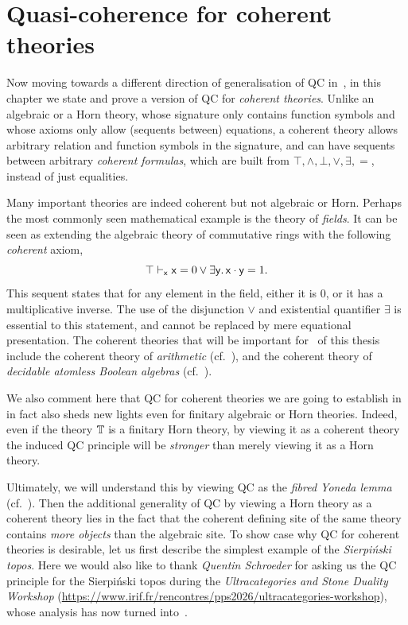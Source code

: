\chapter{Quasi-coherence for coherent theories}\label{ch:sqccoh}

Now moving towards a different direction of generalisation of \gls{QC} in~, in this chapter we state and prove a version of \gls{QC} for \emph{coherent theories}. Unlike an algebraic or a Horn theory, whose signature only contains function symbols and whose axioms only allow (sequents between) equations, a coherent theory allows arbitrary relation and function symbols in the signature, and can have sequents between arbitrary \emph{coherent formulas}, which are built from $\top,\wedge,\bot,\vee,\exists,=$, instead of just equalities.

Many important theories are indeed coherent but not algebraic or Horn. Perhaps the most commonly seen mathematical example is the theory of \emph{fields}. It can be seen as extending the algebraic theory of commutative rings with the following \emph{coherent} axiom,
\[ \top \vdash_{\mathsf{x}} \mathsf{x} = 0 \vee \exists \mathsf{y}.\, \mathsf{x}\cdot \mathsf{y} = 1. \]
This sequent states that for any element in the field, either it is 0, or it has a multiplicative inverse. The use of the disjunction $\vee$ and existential quantifier $\exists$ is essential to this statement, and cannot be replaced by mere equational presentation. The coherent theories that will be important for~ of this thesis include the coherent theory of \emph{arithmetic} (cf.~\citet{ye_categorical_2026}), and the coherent theory of \emph{decidable atomless Boolean algebras} (cf.~\citet[D3.4.12]{johnstone2002sketches}).

We also comment here that \gls{QC} for coherent theories we are going to establish in~ in fact also sheds new lights even for finitary algebraic or Horn theories. Indeed, even if the theory $\mathbb{T}$ is a finitary Horn theory, by viewing it as a coherent theory the induced \gls{QC} principle will be \emph{stronger} than merely viewing it as a Horn theory. 

Ultimately, we will understand this by viewing \gls{QC} as the \emph{fibred Yoneda lemma} (cf.~). Then the additional generality of \gls{QC} by viewing a Horn theory as a coherent theory lies in the fact that the coherent defining site of the same theory contains \emph{more objects} than the algebraic site. To show case why \gls{QC} for coherent theories is desirable, let us first describe the simplest example of the \emph{Sierpi\'nski topos}. Here we would also like to thank \emph{Quentin Schroeder} for asking us the \gls{QC} principle for the Sierpi\'nski topos during the \emph{Ultracategories and Stone Duality Workshop} (\url{https://www.irif.fr/rencontres/pps2026/ultracategories-workshop}), whose analysis has now turned into~.

